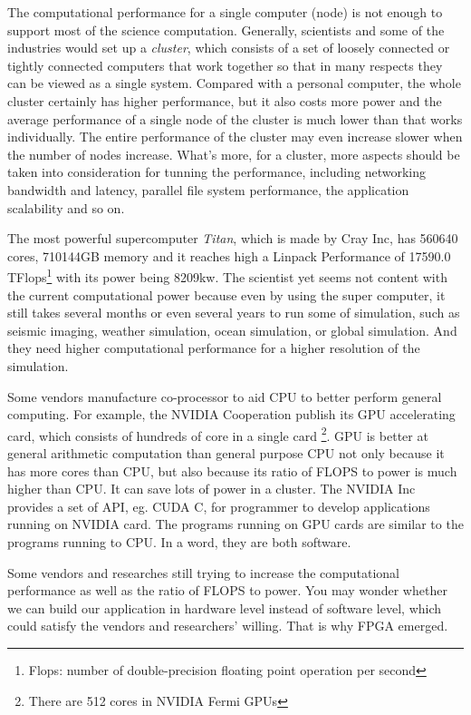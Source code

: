 The computational performance for a single computer (node) is not
enough to support most of the science computation. Generally, scientists
and some of the industries would set up a \emph{cluster}, which consists
of a set of loosely connected or tightly connected computers that
work together so that in many respects they can be viewed as a single
system. Compared with a personal computer, the whole cluster certainly
has higher performance, but it also costs more power and the average
performance of a single node of the cluster is much lower than that
works individually. The entire performance of the cluster may even
increase slower when the number of nodes increase. What's more, for
a cluster, more aspects should be taken into consideration for tunning
the performance, including networking bandwidth and latency, parallel
file system performance, the application scalability and so on.

The most powerful supercomputer \emph{Titan}, which is made by Cray
Inc, has 560640 cores, 710144GB memory and it reaches high a Linpack
Performance of 17590.0 TFlops\footnote {Flops: number of double-precision
floating point operation per second} with its power being 8209kw\cite{top500}.
The scientist yet seems not content with the current computational
power because even by using the super computer, it still takes several
months or even several years to run some of simulation, such as seismic
imaging, weather simulation, ocean simulation, or global simulation.
And they need higher computational performance for a higher resolution
of the simulation.

Some vendors manufacture co-processor to aid CPU to better perform
general computing. For example, the NVIDIA Cooperation publish its
GPU accelerating card, which consists of hundreds of core in a single
card \footnote{There are 512 cores in NVIDIA Fermi GPUs}. GPU is better at general arithmetic
computation than general purpose CPU not only because it has more
cores than CPU, but also because its ratio of FLOPS  to power is much
higher than CPU. It can save lots of power in a cluster. The NVIDIA Inc
provides a set of
API, eg. CUDA C, for programmer to develop applications running on
NVIDIA card. The programs running on GPU cards are similar to the
programs running to CPU. In a word, they are both software.

Some vendors and researches still trying to increase the computational
performance as well as the ratio of FLOPS to power. You may wonder
whether we can build our application in hardware level instead of
software level, which could satisfy the vendors and researchers' willing.
That is why FPGA emerged.

